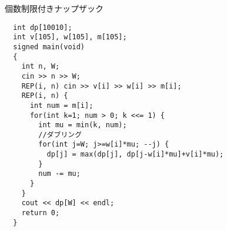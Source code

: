 \documentclass[11pt,a4paper]{jsarticle}
\begin{document}
個数制限付きナップザック
\begin{lstlisting}
  int dp[10010];
  int v[105], w[105], m[105];
  signed main(void)
  {
    int n, W;
    cin >> n >> W;
    REP(i, n) cin >> v[i] >> w[i] >> m[i];
    REP(i, n) {
      int num = m[i];
      for(int k=1; num > 0; k <<= 1) {
        int mu = min(k, num);
        //ダブリング
        for(int j=W; j>=w[i]*mu; --j) {
          dp[j] = max(dp[j], dp[j-w[i]*mu]+v[i]*mu);
        }
        num -= mu;
      }
    }
    cout << dp[W] << endl;
    return 0;
  }

\end{lstlisting}
\end{document}
